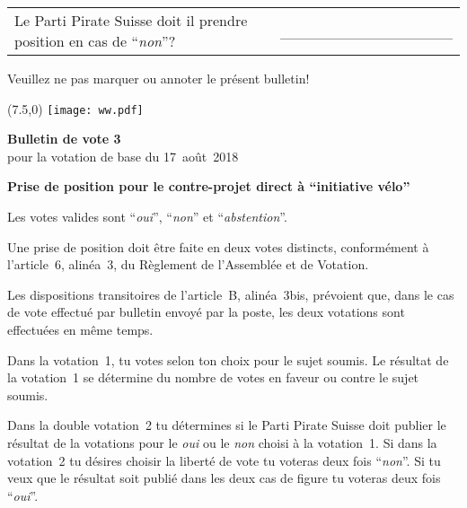 \documentclass[11pt, a4paper]{scrartcl}
\newcommand{\votingdate}{17~août~2018}
\newcommand{\oui}{\enquote{\textit{oui}}}
\newcommand{\non}{\enquote{\textit{non}}}
\newcommand{\abstention}{\enquote{\textit{abstention}}}
\begin{document}
{\begin{minipage}[t][12.5cm][t]{17.7cm}
\vspace{0.5cm}

\begin{tabular}{ b{13.5cm} b{3cm} }
Le Parti Pirate Suisse doit il prendre position en cas de \non{}?
& \_\_\_\_\_\_\_\_\_\_\_\_\_\_\_\_ \\
\end{tabular}

\vspace{0.5cm}

Veuillez ne pas marquer ou annoter le présent bulletin!


\end{minipage}

\newpage

\begin{minipage}[t][12.5cm][t]{17.7cm}

\begin{textblock}{6}(7.5,0)
\texttt{[image: ww.pdf]}
\end{textblock}

{\LARGE\textbf{Bulletin de vote 3}} \\
pour la votation de base du \votingdate{} \\

\vspace{2cm}

\textbf{Prise de position pour le contre-projet direct à \enquote{initiative vélo}}

\vspace{0.2cm}
Les votes valides sont \oui{}, \non{} et \abstention{}.

\vspace{0.2cm}
Une prise de position doit être faite en deux votes distincts, conformément à l'article~6, alinéa~3, du Règlement de l'Assemblée et de Votation.

\vspace{0.2cm}
Les dispositions transitoires de l'article~B, alinéa~3bis, prévoient que, dans le cas de vote effectué par bulletin envoyé par la poste, les deux votations sont effectuées en même temps.

\vspace{0.2cm}
Dans la votation~1, tu votes selon ton choix pour le sujet soumis. Le résultat de la votation~1 se détermine du nombre de votes en faveur ou contre le sujet soumis.

\vspace{0.2cm}
Dans la double votation~2 tu détermines si le Parti Pirate Suisse doit publier le résultat de la votations pour le \textit{oui} ou le \textit{non} choisi à la votation~1. Si dans la votation~2 tu désires choisir la liberté de vote tu voteras deux fois \non{}. Si tu veux que le résultat soit publié dans les deux cas de figure tu voteras deux fois \oui{}.


\end{minipage}}
\end{document}
